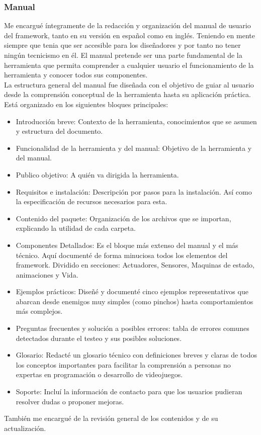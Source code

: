 \subsubsection*{Manual}
Me encargué íntegramente de la redacción y organización del manual de usuario del framework, tanto en su versión en español como en inglés. Teniendo en mente siempre que tenia que ser accesible para los diseñadores y por tanto no tener ningún tecnicismo en él. El manual pretende ser una parte fundamental de la herramienta que permita comprender a cualquier usuario el funcionamiento de la herramienta y conocer todos sus componentes. \\
La estructura general del manual fue diseñada con el objetivo de guiar al usuario desde la comprensión conceptual de la herramienta hasta su aplicación práctica. Está organizado en los siguientes bloques principales:
 \begin{itemize}
    \item Introducción breve: Contexto de la herramienta, conocimientos que se asumen y estructura del documento.
    \item Funcionalidad de la herramienta y del manual:  Objetivo de la herramienta y del manual.
    \item Publico objetivo: A quién va dirigida la herramienta.
    \item Requisitos e instalación: Descripción por pasos para la instalación. Así como la especificación de recursos necesarios  para esta.
    \item Contenido del paquete: Organización de los archivos que se importan, explicando la utilidad de cada carpeta.
    \item Componentes Detallados: Es el bloque más extenso del manual y el más técnico. Aquí documenté de forma minuciosa todos los elementos del framework. Dividido en secciones: Actuadores, Sensores, Maquinas de estado, animaciones y Vida.
    \item Ejemplos prácticos: Diseñé y documenté cinco ejemplos representativos que abarcan desde enemigos muy simples (como pinchos) hasta comportamientos más complejos.
    \item Preguntas frecuentes y solución a posibles errores: tabla de errores comunes detectados durante el testeo y sus posibles soluciones.
    \item Glosario: Redacté un glosario técnico con definiciones breves y claras de todos los conceptos importantes para facilitar la comprensión a personas no expertas en programación o desarrollo de videojuegos.
    \item Soporte: Incluí la información de contacto para que los usuarios pudieran resolver dudas o proponer mejoras.
  \end{itemize}
También me encargué de la revisión general de los contenidos y de su actualización.

